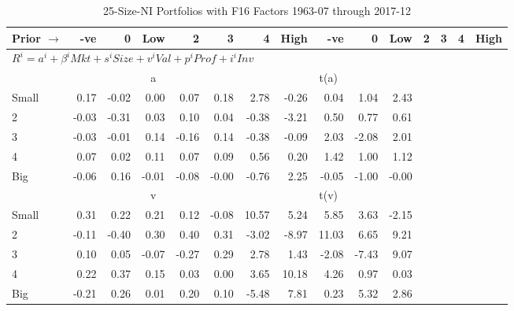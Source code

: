 
\begin{table}[!ht]
\footnotesize
\centering
\caption{25-Size-NI Portfolios with F16 Factors 1963-07 through 2017-12}
\begin{tabular}{lrrrrrrrrrrrrrr}
  \toprule
    Prior $\rightarrow$ & -ve & 0 & Low & 2 & 3 & 4 & High & -ve & 0 & Low & 2 & 3 & 4 & High \\ 
  \midrule
  \multicolumn{11}{l}{$R^i=a^i+\beta^iMkt+s^iSize+v^iVal+p^iProf+i^iInv$} \\

  
    
      & \multicolumn{5}{c}{a} & \multicolumn{5}{c}{t(a)}
    
    \\
      \cmidrule(r){2-6} \cmidrule(r){7-11}

    Small   & 0.17  & -0.02  & 0.00  & 0.07  & 0.18  & 2.78  & -0.26  & 0.04  & 1.04  & 2.43  \\
         2  & -0.03  & -0.31  & 0.03  & 0.10  & 0.04  & -0.38  & -3.21  & 0.50  & 0.77  & 0.61  \\
         3  & -0.03  & -0.01  & 0.14  & -0.16  & 0.14  & -0.38  & -0.09  & 2.03  & -2.08  & 2.01  \\
         4  & 0.07  & 0.02  & 0.11  & 0.07  & 0.09  & 0.56  & 0.20  & 1.42  & 1.00  & 1.12  \\
    Big     & -0.06  & 0.16  & -0.01  & -0.08  & -0.00  & -0.76  & 2.25  & -0.05  & -1.00  & -0.00  \\

  
    
      & \multicolumn{5}{c}{v} & \multicolumn{5}{c}{t(v)}
    
    \\
      \cmidrule(r){2-6} \cmidrule(r){7-11}

    Small   & 0.31  & 0.22  & 0.21  & 0.12  & -0.08  & 10.57  & 5.24  & 5.85  & 3.63  & -2.15  \\
         2  & -0.11  & -0.40  & 0.30  & 0.40  & 0.31  & -3.02  & -8.97  & 11.03  & 6.65  & 9.21  \\
         3  & 0.10  & 0.05  & -0.07  & -0.27  & 0.29  & 2.78  & 1.43  & -2.08  & -7.43  & 9.07  \\
         4  & 0.22  & 0.37  & 0.15  & 0.03  & 0.00  & 3.65  & 10.18  & 4.26  & 0.97  & 0.03  \\
    Big     & -0.21  & 0.26  & 0.01  & 0.20  & 0.10  & -5.48  & 7.81  & 0.23  & 5.32  & 2.86  \\

  
    

\end{tabular}
\end{table}
